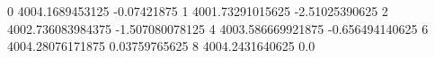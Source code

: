 0 4004.1689453125 -0.07421875
1 4001.73291015625 -2.51025390625
2 4002.736083984375 -1.507080078125
4 4003.586669921875 -0.656494140625
6 4004.28076171875 0.03759765625
8 4004.2431640625 0.0
